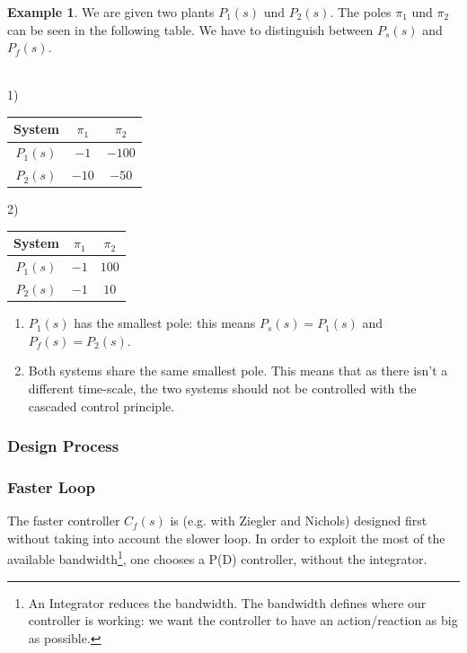 \documentclass[a4paper,12 pt]{article}
\numberwithin{equation}{section}
\theoremstyle{definition}
\newtheorem{bsp}{Example}
\theoremstyle{remark}
\theoremstyle{definition}
\theoremstyle{definition}
\theoremstyle{definition}
\theoremstyle{remark}
\begin{document}
\begin{bsp}
We are given two plants $P_1(s)$ und $P_2(s)$. The poles $\pi_1$ und $\pi_2$ can be seen in the following table. We have to distinguish between $P_s(s)$ and $P_f(s)$. \\ \\
\begin{minipage}{.5\columnwidth}
\begin{center}
1)\qquad \begin{tabular}{ccc}\toprule
System & $\pi_1$ & $\pi_2$ \\ \midrule
$P_1(s)$ & $-1$ & $-100$ \\
$P_2(s)$ & $-10$ & $-50$ \\ \bottomrule
\end{tabular}
\end{center}
\end{minipage}
\begin{minipage}{.5\columnwidth}
\begin{center}
2)\qquad \begin{tabular}{ccc}\toprule
System & $\pi_1$ & $\pi_2$ \\ \midrule
$P_1(s)$ & $-1$ & $100$ \\
$P_2(s)$ & $-1$ & $10$ \\ \bottomrule
\end{tabular}
\end{center}
\end{minipage}
\begin{enumerate}[1)]
\item $P_1(s)$ has the smallest pole: this means $P_s(s)=P_1(s)$ and $P_f(s)=P_2(s)$.
\item Both systems share the same smallest pole. This means that as there isn't a different time-scale, the two systems should not be controlled with the cascaded control principle.
\end{enumerate}
\end{bsp}

\subsubsection{Design Process}
\subsubsection*{Faster Loop}
The faster controller $C_f(s)$ is (e.g. with Ziegler and Nichols) designed first without taking into account the slower loop. In order to exploit the most of the available bandwidth\footnote{An Integrator reduces the bandwidth. The bandwidth defines where our controller is working: we want the controller to have an action/reaction as big as possible.}, one chooses a P(D) controller, without the integrator.
\end{document}
